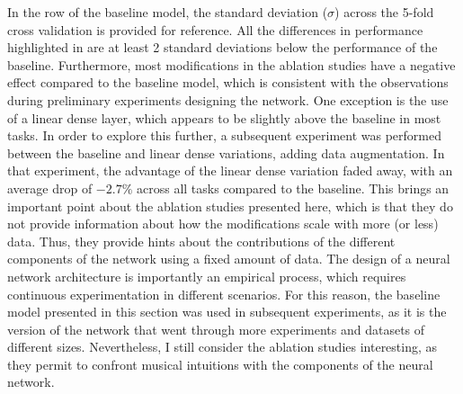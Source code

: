 In the row of the baseline model, the standard deviation
($\sigma$) across the 5-fold cross validation is provided
for reference. All the differences in performance
highlighted in  are at least 2 standard
deviations below the performance of the baseline.
Furthermore, most modifications in the ablation studies have
a negative effect compared to the baseline model, which is
consistent with the observations during preliminary
experiments designing the network. One exception is the use
of a linear dense layer, which appears to be slightly above
the baseline in most tasks. In order to explore this
further, a subsequent experiment was performed between the
baseline and linear dense variations, adding data
augmentation. In that experiment, the advantage of the
linear dense variation faded away, with an average drop of
$-2.7\%$ across all tasks compared to the baseline. This
brings an important point about the ablation studies
presented here, which is that they do not provide
information about how the modifications scale with more (or
less) data. Thus, they provide hints about the contributions
of the different components of the network using a fixed
amount of data. The design of a neural network architecture
is importantly an empirical process, which requires
continuous experimentation in different scenarios. For this
reason, the baseline model presented in this section was
used in subsequent experiments, as it is the version of the
network that went through more experiments and datasets of
different sizes. Nevertheless, I still consider the ablation
studies interesting, as they permit to confront musical
intuitions with the components of the neural network. 
